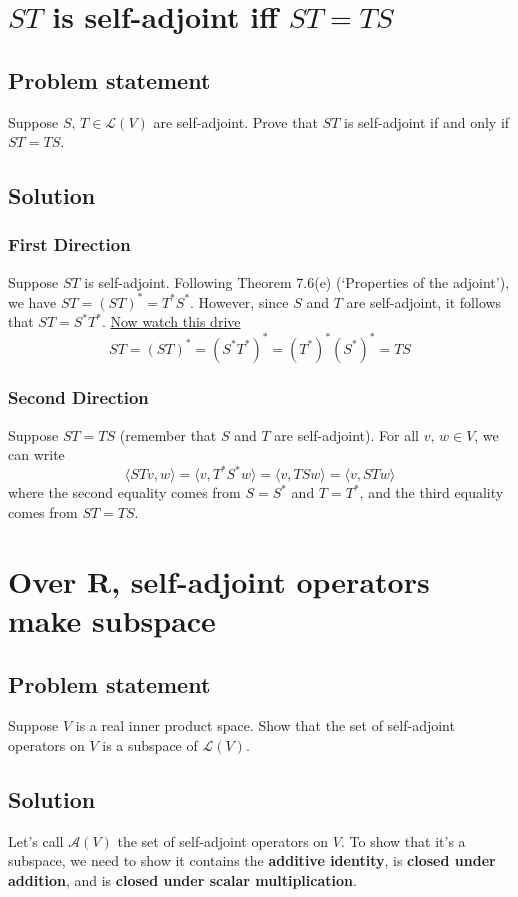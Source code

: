 \documentclass{article}
\begin{document}
\renewcommand{\thesection}{7}
\section{$ST$ is self-adjoint iff $ST=TS$}
\subsection*{Problem statement}
Suppose $S,\,T\in\mathcal{L}(V)$ are self-adjoint. Prove that $ST$ is self-adjoint if and only if $ST=TS$.

\subsection*{Solution}
\subsubsection*{First Direction}
Suppose $ST$ is self-adjoint. Following Theorem 7.6(e) (`Properties of the adjoint'), we have $ST=(ST)^*=T^*S^*$. However, since $S$ and $T$ are self-adjoint, it follows that $ST=S^*T^*$. \href{https://www.youtube.com/watch?v=TCm9788Tb5g}{Now watch this drive}
\[ST=(ST)^*=(S^*T^*)^*=(T^*)^*(S^*)^*=TS\]

\subsubsection*{Second Direction}
Suppose $ST=TS$ (remember that $S$ and $T$ are self-adjoint). For all $v,\,w\in V$, we can write
\[\langle STv,w\rangle=\langle v, T^*S^*w\rangle=\langle v,TSw\rangle=\langle v,STw\rangle\]
where the second equality comes from $S=S^*$ and $T=T^*$, and the third equality comes from $ST=TS$.

\clearpage

\renewcommand{\thesection}{8}
\section{Over $\mathbf{R}$, self-adjoint operators make subspace}
\subsection*{Problem statement}
Suppose $V$ is a real inner product space. Show that the set of self-adjoint operators on $V$ is a subspace of $\mathcal{L}(V)$.

\subsection*{Solution}
Let's call $\mathcal{A}(V)$ the set of self-adjoint operators on $V$. To show that it's a subspace, we need to show it contains the \textbf{additive identity}, is \textbf{closed under addition}, and is \textbf{closed under scalar multiplication}.
\end{document}
